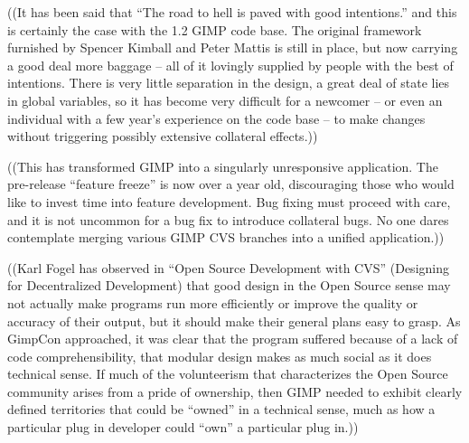 ((It has been said that ``The road to hell is paved with good intentions.'' and this is certainly the case with the 1.2 GIMP code base. The original framework furnished by Spencer Kimball and Peter Mattis is still in place, but now carrying a good deal more baggage -- all of it lovingly supplied by people with the best of intentions. There is very little separation in the design, a great deal of state lies in global variables, so it has become very difficult for a newcomer -- or even an individual with a few year's experience on the code base -- to make changes without triggering possibly extensive collateral effects.))

((This has transformed GIMP into a singularly unresponsive application.
The pre-release ``feature freeze'' is now over a year old, discouraging
those who would like to invest time into feature development.  Bug fixing must proceed with care, and it is not uncommon for a bug fix to introduce collateral bugs. No one dares contemplate merging various GIMP CVS branches into a unified application.)) 
 
((Karl Fogel has observed in ``Open Source Development with CVS''
(Designing for Decentralized Development) that good design in the Open
Source sense may not actually make programs run more efficiently or improve the quality or accuracy of their output, but it should make their general plans easy to grasp. As GimpCon approached, it was clear that the program suffered because of a lack of code comprehensibility, that modular design makes as much social as it does technical sense. If much of the volunteerism that characterizes the Open Source community arises from a pride of ownership, then GIMP needed to exhibit clearly defined territories that could be ``owned'' in a technical sense, much as how a particular plug in developer could ``own'' a particular plug in.))

 

